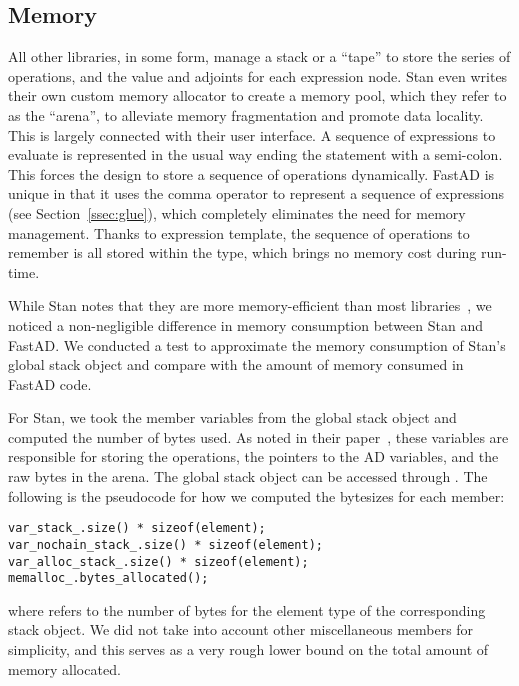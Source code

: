 \subsection{Memory} 

All other libraries, in some form, manage a stack or a ``tape''
to store the series of operations, and
the value and adjoints for each expression node.
Stan even writes their own custom memory allocator to create a memory pool,
which they refer to as the ``arena'', to alleviate memory fragmentation
and promote data locality.
This is largely connected with their user interface.
A sequence of expressions to evaluate is represented 
in the usual way ending the statement with a semi-colon.
This forces the design to store a sequence of operations dynamically.
FastAD is unique in that it uses the comma operator to represent a sequence of expressions
(see Section~\ref{ssec:glue}), which completely eliminates the need for memory management.
Thanks to expression template, the sequence of operations to remember
is all stored within the type, which brings no memory cost during run-time.

While Stan notes that they are more memory-efficient than most libraries~\cite{carpenter:2015},
we noticed a non-negligible difference in memory consumption between Stan and FastAD.
We conducted a test to approximate the memory consumption of Stan's global stack object
and compare with the amount of memory consumed in FastAD code.

For Stan, we took the member variables
from the global stack object and computed the number of bytes used.
As noted in their paper~\cite{carpenter:2015}, these variables are responsible for storing
the operations, the pointers to the AD variables, and the raw bytes in the arena.
The global stack object can be accessed through .
The following is the pseudocode for how we computed the bytesizes for each member:
\begin{lstlisting}[style=customcpp]
var_stack_.size() * sizeof(element);
var_nochain_stack_.size() * sizeof(element);
var_alloc_stack_.size() * sizeof(element);
memalloc_.bytes_allocated();
\end{lstlisting}
where  refers to the number of bytes 
for the element type of the corresponding stack object.
We did not take into account other miscellaneous members for simplicity,
and this serves as a very rough lower bound on the total amount of memory allocated.

